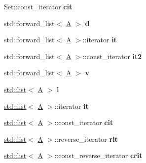 \begin{DoxyCompactItemize}
Set\+::const\+\_\+iterator {\bfseries cit}
\item 
\mbox{\label{struct_a_a2201c978eee5f2e7d10035ca3a72eb73}} 
std\+::forward\+\_\+list$<$ \mbox{\hyperlink{struct_a}{A}} $>$ {\bfseries d}
\item 
\mbox{\label{struct_a_ae18d217ee1ad3bcc2402e7ff4ec634e2}} 
std\+::forward\+\_\+list$<$ \mbox{\hyperlink{struct_a}{A}} $>$\+::iterator {\bfseries it}
\item 
\mbox{\label{struct_a_ad3653fbf3c142a50b68f5820def74100}} 
std\+::forward\+\_\+list$<$ \mbox{\hyperlink{struct_a}{A}} $>$\+::const\+\_\+iterator {\bfseries it2}
\item 
\mbox{\label{struct_a_a11530849d53d6c371c4767a9c817f464}} 
std\+::forward\+\_\+list$<$ \mbox{\hyperlink{struct_a}{A}} $>$ {\bfseries v}
\item 
\mbox{\label{struct_a_accb741e80cb686e13fded955a9af90f0}} 
\mbox{\hyperlink{classstd_1_1list}{std\+::list}}$<$ \mbox{\hyperlink{struct_a}{A}} $>$ {\bfseries l}
\item 
\mbox{\label{struct_a_a8261ddcf4cc732b26c0d09425cf4f59a}} 
\mbox{\hyperlink{classstd_1_1list}{std\+::list}}$<$ \mbox{\hyperlink{struct_a}{A}} $>$\+::iterator {\bfseries it}
\item 
\mbox{\label{struct_a_a9642d835b1a8aaa95453984db2046404}} 
\mbox{\hyperlink{classstd_1_1list}{std\+::list}}$<$ \mbox{\hyperlink{struct_a}{A}} $>$\+::const\+\_\+iterator {\bfseries cit}
\item 
\mbox{\label{struct_a_a181e40f02a4b3d2b25b040d2380fd118}} 
\mbox{\hyperlink{classstd_1_1list}{std\+::list}}$<$ \mbox{\hyperlink{struct_a}{A}} $>$\+::reverse\+\_\+iterator {\bfseries rit}
\item 
\mbox{\label{struct_a_a1d99adc6dd74fc5bae72cef79f516266}} 
\mbox{\hyperlink{classstd_1_1list}{std\+::list}}$<$ \mbox{\hyperlink{struct_a}{A}} $>$\+::const\+\_\+reverse\+\_\+iterator {\bfseries crit}
\item 
\mbox{\label{struct_a_a2275f992f2979a4082a65bab3609d48d}} 

\end{DoxyCompactItemize}
